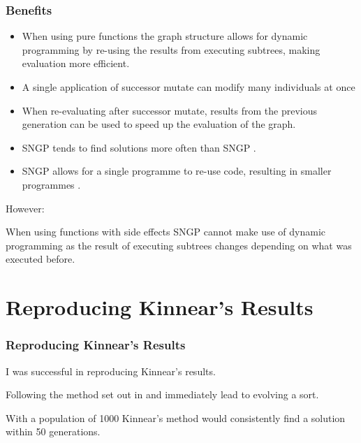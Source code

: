 \documentclass{beamer}
\begin{document}
		\begin{frame}
		
			\frametitle{Benefits}
					
			\begin{itemize}
				
				\item When using pure functions the graph structure allows for dynamic programming by re-using the results from executing subtrees, making evaluation more efficient.
				\item A single application of successor mutate can modify many individuals at once
				\item When re-evaluating after successor mutate, results from the previous generation can be used to speed up the evaluation of the graph.
				\item SNGP tends to find solutions more often than SNGP \cite{jackson_new_2012, jackson_single_2012}.
				\item SNGP allows for a single programme to re-use code, resulting in smaller programmes \cite{jackson_new_2012}.
				
			\end{itemize}
			
			\pause
			
			However:
			
			When using functions with side effects SNGP cannot make use of dynamic programming as the result of executing subtrees changes depending on what was executed before.

		
		\end{frame}
		
	\section{Reproducing Kinnear's Results}
	
		\begin{frame}
		
			\frametitle{Reproducing Kinnear's Results}
			
			I was successful in reproducing Kinnear's results.
			
			\pause
			
			Following the method set out in \cite{kinnear_generality_1993} and \cite{kinnear_evolving_1993} immediately lead to evolving a sort.
			
			\pause
			
			With a population of 1000 Kinnear's method would consistently find a solution within 50 generations.
			
		\end{frame}
	
\end{document}
